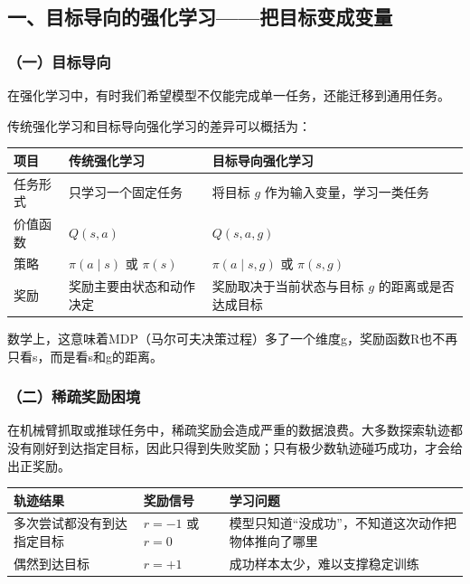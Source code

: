 \hypertarget{ux4e00ux76eeux6807ux5bfcux5411ux7684ux5f3aux5316ux5b66ux4e60ux628aux76eeux6807ux53d8ux6210ux53d8ux91cf}{%
\subsection{一、目标导向的强化学习------把目标变成变量}\label{ux4e00ux76eeux6807ux5bfcux5411ux7684ux5f3aux5316ux5b66ux4e60ux628aux76eeux6807ux53d8ux6210ux53d8ux91cf}}

\hypertarget{ux4e00ux76eeux6807ux5bfcux5411}{%
\subsubsection{（一）目标导向}\label{ux4e00ux76eeux6807ux5bfcux5411}}

在强化学习中，有时我们希望模型不仅能完成单一任务，还能迁移到通用任务。

传统强化学习和目标导向强化学习的差异可以概括为：

\begin{longtable}[]{@{}lll@{}}
\toprule
项目 & 传统强化学习 & 目标导向强化学习 \\
\midrule
\endhead
任务形式 & 只学习一个固定任务 & 将目标 \(g\) 作为输入变量，学习一类任务 \\
价值函数 & \(Q(s,a)\) & \(Q(s,a,g)\) \\
策略 & \(\pi(a\mid s)\) 或 \(\pi(s)\) & \(\pi(a\mid s,g)\) 或 \(\pi(s,g)\) \\
奖励 & 奖励主要由状态和动作决定 & 奖励取决于当前状态与目标 \(g\) 的距离或是否达成目标 \\
\bottomrule
\end{longtable}

数学上，这意味着MDP（马尔可夫决策过程）多了一个维度g，奖励函数R也不再只看s，而是看s和g的距离。

\hypertarget{ux4e8cux7a00ux758fux5956ux52b1ux56f0ux5883}{%
\subsubsection{（二）稀疏奖励困境}\label{ux4e8cux7a00ux758fux5956ux52b1ux56f0ux5883}}

在机械臂抓取或推球任务中，稀疏奖励会造成严重的数据浪费。大多数探索轨迹都没有刚好到达指定目标，因此只得到失败奖励；只有极少数轨迹碰巧成功，才会给出正奖励。

\begin{longtable}[]{@{}lll@{}}
\toprule
轨迹结果 & 奖励信号 & 学习问题 \\
\midrule
\endhead
多次尝试都没有到达指定目标 & \(r=-1\) 或 \(r=0\) & 模型只知道``没成功''，不知道这次动作把物体推向了哪里 \\
偶然到达目标 & \(r=+1\) & 成功样本太少，难以支撑稳定训练 \\
\bottomrule
\end{longtable}

